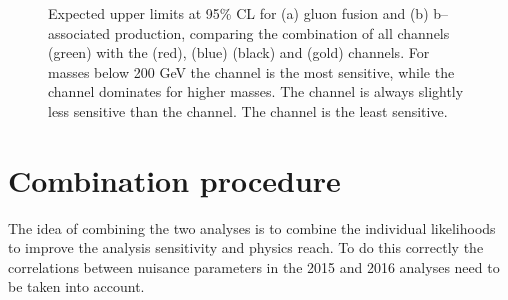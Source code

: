 \begin{figure}[h!]
\begin{center}
\end{center}
\caption[Expected upper limits at 95\% CL for the gluon fusion and b-associated
production, comparing the combination of all channels with the per-channel limits.]{Expected upper limits at 95\% CL for (a) gluon fusion and (b) b--associated production,
comparing the combination of all channels (green) with the \mutau (red), \etau (blue) \tautau (black)
and \emu (gold) channels. For masses below 200 GeV the \mutau channel is the most sensitive,
while the \tautau channel dominates for higher masses. The \etau channel is always
slightly less sensitive than the \mutau channel. The \emu channel is the least sensitive.}
\label{fig:mssm_results_limits_breakdown_hig16006}
\end{figure}
\clearpage


\section{Combination procedure}
\label{sec:mssm_combination_procedure}
The idea of combining the two analyses is to combine the 
individual likelihoods to improve the analysis sensitivity and
physics reach. To do this correctly the correlations between
nuisance parameters in the 2015 and 2016 analyses need to be taken into account.

